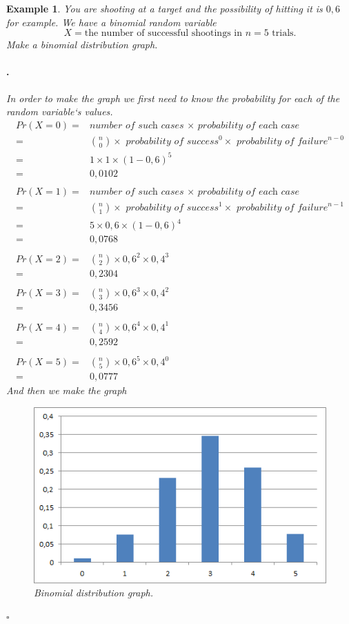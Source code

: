 \documentclass[12pt, a4paper,leqno]{report}
\newenvironment{solution}{\paragraph{\normalfont{\textit{Solution}}.}}{\hfill\null$\square$}
\theoremstyle{normal}
\theoremstyle{normal}
\newtheorem{example}{Example}[chapter]
\begin{document}
	\begin{example}
		You are shooting at a target and the possibility of hitting it is $0,6$ for example. We have a binomial random variable 
		\[ X = \text{the number of successful shootings in } n = 5 \text{ trials}. \] 
		Make a binomial distribution graph.
		\begin{solution}
			In order to make the graph we first need to know the probability for each of the random variable`s values.		
			\[\begin{split}
  				Pr(X = 0) = & \textit{number of such cases } \times \textit{ probability of each case} \\
   				= & \binom{n}{0} \times \textit{ probability of success}^0 \times \textit{ probability of failure}^{n - 0} \\
   				= & 1\times 1\times (1-0,6)^5 \\
   				= & 0,0102 \\
   				\\
  				Pr(X = 1) = & \textit{number of such cases } \times \textit{ probability of each case} \\
   				= & \binom{n}{1} \times \textit{ probability of success}^1 \times \textit{ probability of failure}^{n - 1} \\
   				= & 5\times 0,6\times (1-0,6)^4 \\
   				= & 0,0768 \\
   				\\
  				Pr(X = 2) = & \binom{n}{2} \times 0,6^2 \times 0,4^3 \\
   				= & 0,2304 \\
   				\\
  				Pr(X = 3) = & \binom{n}{3} \times 0,6^3 \times 0,4^2 \\
   				= & 0,3456 \\
   				\\
  				Pr(X = 4) = & \binom{n}{4} \times 0,6^4 \times 0,4^1 \\
   				= & 0,2592 \\ 
   				\\
  				Pr(X = 5) = & \binom{n}{5} \times 0,6^5 \times 0,4^0 \\
   				= & 0,0777
			\end{split}\]
			And then we make the graph
			\begin{figure}[h!]
				\caption{Binomial distribution graph.}
				\centering
					\includegraphics[width=12cm]{binomial_graph.png}
			\end{figure}			
			

\end{solution}
\end{example}
\end{document}
